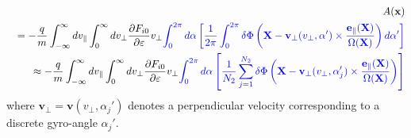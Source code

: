 \documentclass{llncs}
\newcommand{\tmcolor}[2]{{\color{#1}{#2}}}
\begin{document}
\begin{eqnarray*}
  &  & A (\mathbf{x})\\
  &  & = - \frac{q}{m} \int_{- \infty}^{\infty} d v_{\parallel}
  \int_0^{\infty} d v_{\perp} \frac{\partial F_{i 0}}{\partial \varepsilon}
  v_{\perp} \tmcolor{blue}{\int_0^{2 \pi} d \alpha \left[ \frac{1}{2 \pi}
  \int_0^{2 \pi} \delta \Phi \left( \mathbf{X}-\mathbf{v}_{\perp} (v_{\perp},
  \alpha') \times \frac{\mathbf{e}_{\parallel} (\mathbf{X})}{\Omega
  (\mathbf{X})} \right) d \alpha' \right]}\\
  &  & \approx - \frac{q}{m} \int_{- \infty}^{\infty} d v_{\parallel}
  \int_0^{\infty} d v_{\perp} \frac{\partial F_{i 0}}{\partial \varepsilon}
  v_{\perp} \tmcolor{blue}{\int_0^{2 \pi} d \alpha \left[ \frac{1}{N_2}
  \sum_{j = 1}^{N_2} \delta \Phi \left( \mathbf{X}-\mathbf{v}_{\perp}
  (v_{\perp}, \alpha'_j) \times \frac{\mathbf{e}_{\parallel}
  (\mathbf{X})}{\Omega (\mathbf{X})} \right) \right]}
\end{eqnarray*}
where $\mathbf{v}_{\perp} = \mathbf{v} (v_{\perp}, \alpha_j')$ denotes a
perpendicular velocity corresponding to a discrete gyro-angle $\alpha_j'$.
\end{document}
